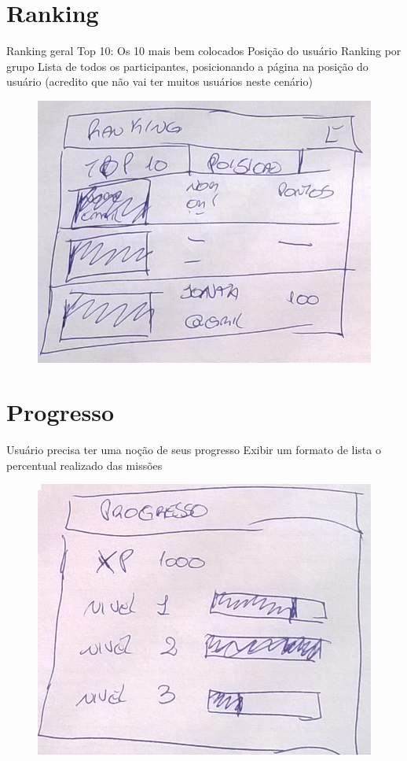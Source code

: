 \documentclass[
	12pt,				%
	oneside,			%
	a4paper,			%
	english,			%
	french,				%
	spanish,			%
	brazil,				%
	]{abntex2}
\begin{document}
\section{Ranking}

Ranking geral
Top 10: Os 10 mais bem colocados 
Posição do usuário
Ranking por grupo
Lista de todos os participantes, posicionando a página na posição do usuário (acredito que não vai ter muitos usuários neste cenário) 

\begin{figure}[ht]
\centering
\includegraphics[width=1\textwidth]{imagens/proposta_ranking.png}
\end{figure}

\section{Progresso}

Usuário precisa ter uma noção de seus progresso
Exibir um formato de lista o percentual realizado das missões 

\begin{figure}[ht]
\centering
\includegraphics[width=1\textwidth]{imagens/proposta_progresso.png}
\end{figure}
\end{document}
